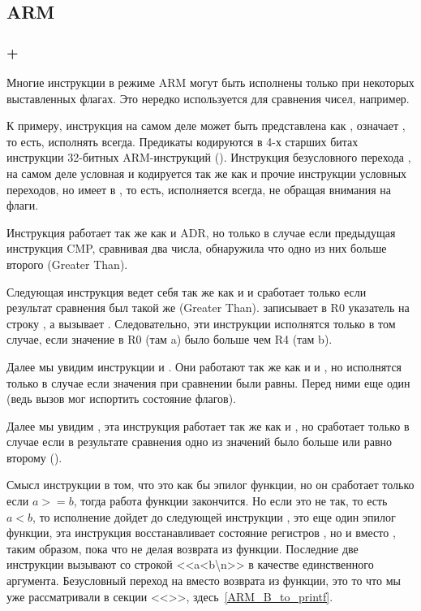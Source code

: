 ﻿%
\subsection{ARM}

\subsubsection{\OptimizingKeil + \ARMMode}



Многие инструкции в режиме ARM могут быть исполнены только при некоторых выставленных флагах.
Это нередко используется для сравнения чисел, например.

К примеру, инструкция  на самом деле может быть представлена как ,  означает 
, то есть, исполнять всегда. Предикаты кодируются в 4-х старших битах инструкции 32-битных ARM-инструкций
().
Инструкция безусловного перехода , на самом деле условная и кодируется так же как и прочие инструкции условных
переходов, но имеет  в , то есть, исполняется всегда, не обращая внимания на флаги.

Инструкция  работает так же как и ADR, но только в случае если предыдущая инструкция CMP,
сравнивая два числа, обнаружила что одно из них больше второго (Greater Than).

Следующая инструкция  ведет себя так же как и  и сработает только если 
результат сравнения был такой же (Greater Than).  записывает в R0 указатель на строку 
,
а  вызывает \printf. Следовательно, эти инструкции исполнятся только в том случае, если значение
в R0 (там a) было больше чем R4 (там b). 

Далее мы увидим инструкции  и . Они работают так же как и  и , 
но исполнятся только в случае если
значения при сравнении были равны. Перед ними еще один \CMP (ведь вызов \printf мог испортить состояние флагов).

Далее мы увидим , эта инструкция работает так же как и , но сработает только в случае если 
в результате сравнения одно из значений было больше или равно второму ().

Смысл инструкции  в том, что это как бы эпилог функции, но он сработает только
если $a>=b$, тогда работа функции закончится. 
Но если это не так, то есть $a<b$, то исполнение дойдет до следующей инструкции 
, это еще один эпилог функции, эта инструкция восстанавливает состояние регистров
, но и \LR вместо \PC, таким образом, пока что не делая возврата из функции. 
Последние две инструкции вызывают
\printf со строкой <<a<b\textbackslash{}n>> в качестве единственного аргумента. Безусловный переход на \printf вместо возврата
из функции, это то что мы уже рассматривали в секции <<\PrintfSeveralArgumentsSectionName>>, 
здесь~\ref{ARM_B_to_printf}.

